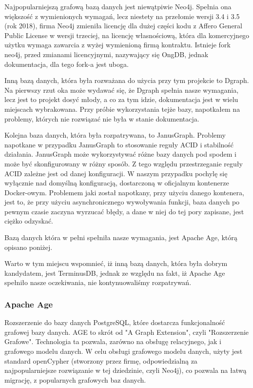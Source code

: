 \documentclass[a4paper, 12pt]{article}
\begin{document}
Najpopularniejszą grafową bazą danych jest niewątpiwie Neo4j. Spełnia ona większość z wymienionych wymagań, lecz niestety na przełomie wersji 3.4 i 3.5 (rok 2018), firma Neo4j zmieniła licencję dla dużej części kodu z Affero General Public License w wersji trzeciej, na licencję własnościową, która dla komercyjnego użytku wymaga zawarcia z wyżej wymienioną firmą kontraktu.\cite{neo4jLicenseChangeBlog} Istnieje fork neo4j, przed zmianami licencyjnymi, nazywający się OngDB, jednak dokumentacja, dla tego fork-a jest uboga.

Inną bazą danych, która była rozważana do użycia przy tym projekcie to Dgraph. Na pierwszy rzut oka może wydawać się, że Dgraph spełnia nasze wymagania, lecz jest to projekt dosyć młody, a co za tym idzie, dokumentacja jest w wielu miejscach wybrakowana. Przy próbie wykorzystania tejże bazy, napotkałem na problemy, których nie rozwiązać nie była w stanie dokumentacja.

Kolejna baza danych, która była rozpatrywana, to JanusGraph. Problemy napotkane w przypadku JanusGraph to stosowanie reguły ACID i stabilność działania. JanusGraph może wykorzystywać różne bazy danych pod spodem i może być skonfigurowany w różny sposób. Z tego względu przestrzeganie reguły ACID zależne jest od danej konfiguracji. W naszym przypadku pochylę się wyłącznie nad domyślną konfiguracją, dostarczoną w oficjalnym kontenerze Docker-owym. Problemem jaki został napotkany, przy użyciu danego kontenera, jest to, że przy użyciu asynchronicznego wywoływania funkcji, baza danych po pewnym czasie zaczyna wyrzucać błędy, a dane w niej do tej pory zapisane, jest ciężko odzyskać.

Bazą danych która w pełni spełniła nasze wymagania, jest Apache Age, którą opisano poniżej.

Warto w tym miejscu wspomnieć, iż inną bazą danych, która była dobrym kandydatem, jest TerminusDB, jednak ze względu na fakt, iż Apache Age spełniło nasze oczekiwania, nie kontynuowaliśmy rozpatrywań.

\subsubsection{Apache Age}
Rozszerzenie do bazy danych PostgreSQL, które dostarcza funkcjonalność grafowej bazy danych. AGE to skrót od "A Graph Extension", czyli "Rozszerzenie Grafowe". Technologia ta pozwala, zarówno na obsługę relacyjnego, jak i grafowego modelu danych. W celu obsługi grafowego modelu danych, użyty jest standard openCypher (stworzony przez firmę, odpowiedzialną za najpopularniejsze rozwiązanie w tej dziedzinie, czyli Neo4j\cite{openCypherAbout}), co pozwala na łatwą migrację, z popularnych grafowych baz danych.\cite{ApacheAGEOverview}
\end{document}
